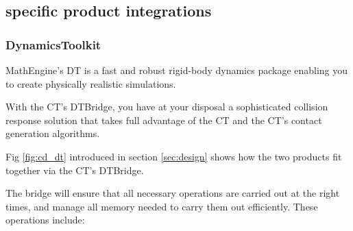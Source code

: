 \documentclass[11pt]{article}
\begin{document}
\subsection{ specific product integrations }

%
%
%
%
%
%


\subsubsection{ DynamicsToolkit }

MathEngine's DT is a fast and robust rigid-body dynamics package
enabling you to create physically realistic simulations.

With the CT's DTBridge, you have at your disposal a 
sophisticated collision response solution
that takes full advantage of the CT and the CT's contact generation
algorithms.


Fig \ref{fig:cd_dt} introduced in section \ref{sec:design} 
shows how the two products fit together via the CT's DTBridge.

The bridge will ensure that all necessary operations are carried out at the right
times, and manage all memory needed to carry them out efficiently.
These operations include:
\end{document}

